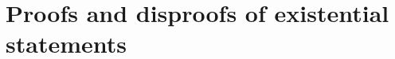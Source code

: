 


\newpage

\section[Existential statements]{Proofs and disproofs of existential statements}






%
%

 
